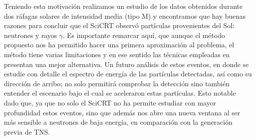 Teniendo esta motivación realizamos un estudio de los datos obtenidos durante dos ráfagas solares de intensidad media (tipo M) y encontramos que hay buenas razones para concluir que el SciCRT observó partículas provenientes del Sol: neutrones y rayos $\gamma$. Es importante remarcar aquí, que aunque el método propuesto nos ha permitido hacer una primera aproximación al problema, el método tiene varias limitaciones y en ese sentido las técnicas empleadas en \cite{garcia20} presentan una mejor alternativa. Un futuro análisis de estos eventos, en donde se estudie con detalle el espectro de energía de las partículas detectadas, así como su dirección de arribo; no solo permitirá comprobar la detección sino también entender el escenario bajo el cual se aceleraron estas partículas. Esto notable dado que, ya que no solo el SciCRT no ha permite estudiar con mayor profundidad estos eventos, sino que además nos abre una nueva ventana al ser más sensible a neutrones de baja energía, en comparación con la generación previa de TNS.
